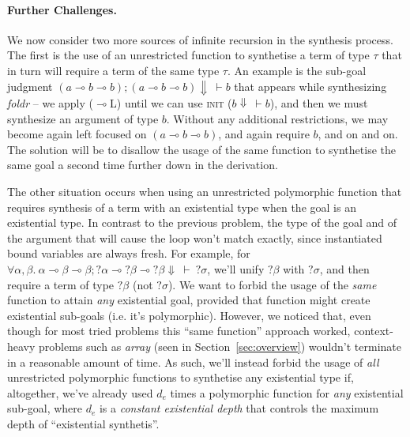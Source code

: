 \documentclass{llncs}
\newcommand{\lolli}{\multimap}
\newcommand{\mypara}[1]{\paragraph{\textbf{#1}.}}
\begin{document}
\mypara{Further Challenges} We now consider two more sources of infinite
recursion in the synthesis process. The first is the use of an unrestricted
function to synthetise a term of type $\tau$ that in turn will require a term of
the same type $\tau$. An example is the sub-goal judgment $(a \lolli
b \lolli b); (a \lolli b \lolli b) \Downarrow\ \vdash b$ that
appears while synthesizing \emph{foldr} -- we apply ($\lolli$L)
until we can use \textsc{init} ($b \Downarrow\ \vdash b$), and then we must
synthesize an argument of type $b$. Without any additional restrictions, we
may become again left focused on $(a \lolli b \lolli b)$, and again require $b$,
and on and on. The solution will be to disallow the usage of the same function
to synthetise the same goal a second time further down in the derivation.

The other situation occurs when using an unrestricted polymorphic function that
requires synthesis of a term with an existential type when the goal is an
existential type. In contrast to the previous problem, the type of the goal and
of the argument that will cause the loop won't match exactly, since instantiated
bound variables are always fresh. For example, for $\forall \alpha,\beta .\
\alpha\lolli\beta\lolli\beta;?\alpha\lolli?\beta\lolli?\beta \Downarrow\ \vdash\
?\sigma$, we'll unify $?\beta$ with $?\sigma$, and then require a term of type
$?\beta$ (not $?\sigma$). We want to forbid the usage of the \emph{same}
function to attain \emph{any} existential goal, provided that function might
create existential sub-goals (i.e. it's polymorphic). However, we noticed that,
even though for most tried problems this ``same function'' approach worked,
context-heavy problems such as \emph{array} (seen in Section~\ref{sec:overview})
wouldn't terminate in a reasonable amount of time.
%
%
As such, we'll instead forbid the usage of \emph{all} unrestricted polymorphic
functions to synthetise any existential type if, altogether, we've already used
$d_e$ times a polymorphic function for \emph{any} existential sub-goal, where
$d_e$ is a \emph{constant existential depth} that controls the maximum depth of
``existential synthetis''.
%
\end{document}

